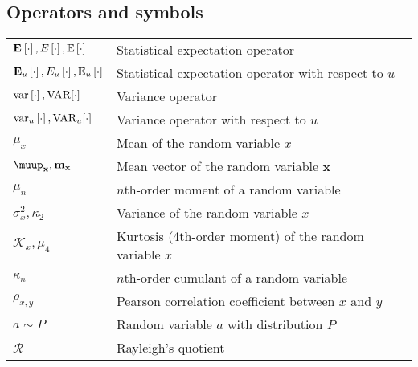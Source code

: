 \documentclass{article}
\begin{document}
\subsection{Operators and symbols}
\begin{xltabular}{\textwidth}{XX}
    \(\E{\cdot}, E\left[ \cdot \right], \mathbb{E}\left[ \cdot \right]\) & Statistical expectation operator \cite{nossekAdaptiveArraySignal2015,dinizAdaptiveFiltering1997}\\
    \(\E[u]{\cdot} , E_u\left[ \cdot \right], \mathbb{E}_u\left[ \cdot \right]\) & Statistical expectation operator with respect to \(u\)\\
    \(\textnormal{var}\left[ \cdot \right], \textnormal{VAR}[\cdot]\) & Variance operator \cite{haykinAdaptiveFilterTheory2002,leon-garciaProbabilityStatisticsRandom2007,proakisDigitalCommunications2007,bishopPatternRecognitionMachine2006}\\
    \(\textnormal{var}_u \left[ \cdot \right], \textnormal{VAR}_u[\cdot]\) & Variance operator with respect to \(u\)\\
    \(\mu_x\) & Mean of the random variable \(x\) \\
    \(\boldsymbol{\muup}_\mathbf{x}, \mathbf{m}_\mathbf{x}\) & Mean vector of the random variable \(\mathbf{x}\) \cite{brownIntroductionRandomSignals1997} \\
    \(\mu_n\) & \(n\)th-order moment of a random variable \\
    \(\sigma_x^2, \kappa_2\) & Variance of the random variable \(x\)\\
    \(\mathcal{K}_x, \mu_4\) & Kurtosis (4th-order moment) of the random variable \(x\)\\
    \(\kappa_n\) & \(n\)th-order cumulant of a random variable \\
    \(\rho_{x,y}\) & Pearson correlation coefficient between \(x\) and \(y\)\\
    \(a\sim P\) & Random variable \(a\) with distribution \(P\) \\
    \(\mathcal{R}\) & Rayleigh's quotient
\end{xltabular}
\end{document}
